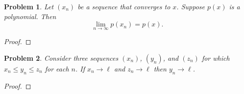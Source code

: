 \documentclass[12pt]{article}
\newtheorem{problem}{Problem}
\begin{document}
\begin{problem} %
Let $(x_n)$ be a sequence that converges to $x$.  Suppose $p(x)$ is a polynomial.  Then
	$$\lim_{n\to\infty} p(x_n) = p(x).$$
\end{problem}


\begin{proof}
\end{proof}


\begin{problem} %
Consider three sequences $(x_n)$, $(y_n)$, and $(z_n)$ for which $x_n \le y_n \le z_n$ for each $n$.  If $x_n \to \ell$ and $z_n \to \ell$ then $y_n \to \ell$.
\end{problem}


\begin{proof}
\end{proof}
\end{document}
